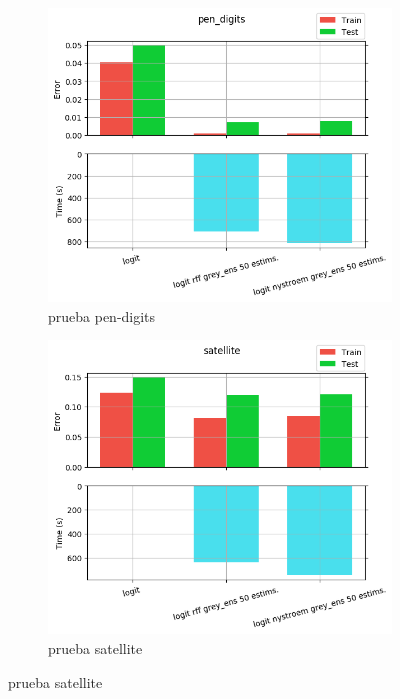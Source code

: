 \begin{figure}[ht]
  \centering
  \begin{subfigure}[b]{0.5\linewidth}
    \centering\includegraphics[width=\imgscale\linewidth]{Figures/2_4/pen_digits}
    \caption{prueba pen-digits}
    \label{fig:2_4_pen_digits}
  \end{subfigure}%
  \begin{subfigure}[b]{0.5\linewidth}
    \centering\includegraphics[width=\imgscale\linewidth]{Figures/2_4/satellite}
    \caption{prueba satellite}
    \label{fig:2_4_satellite}
  \end{subfigure}
\end{figure}

